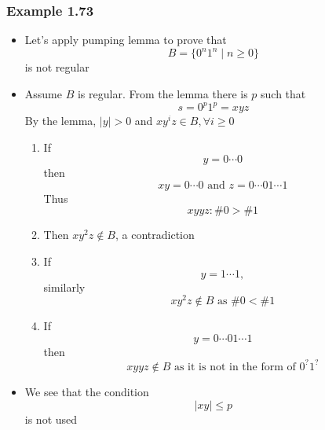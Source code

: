 \begin{frame}[allowframebreaks] \frametitle{Example 1.73}
  \begin{itemize}
  \item Let's apply pumping lemma to prove that
    \begin{equation*}
    B=\{0^n 1^n\mid
    n \geq 0\}
  \end{equation*}
    is not regular
  \item Assume $B$ is regular. From the lemma there is
    $p$ such that
  \begin{equation*}
    s = 0^p 1^p = xy z
  \end{equation*}
  By the lemma, $|y| > 0$ and $xy^i z \in B, \forall i \geq 0$
\begin{enumerate}
\item If
  \begin{equation*}
  y=0 \cdots 0
\end{equation*}
then
\begin{equation*}
xy = 0 \cdots 0 \text{ and }
z = 0 \cdots 0 1 \cdots 1
\end{equation*}
Thus
\begin{equation*}
xyyz: \#0 > \#1
\end{equation*}
\item Then $xy^2 z \notin B$, a contradiction
\item If
  \begin{equation*}
y = 1 \cdots 1,
\end{equation*}
similarly
\begin{equation*}
  xy^2z \notin B \text{ as } \# 0 < \# 1
\end{equation*}

\item If
  \begin{equation*}
y = 0 \cdots 0 1 \cdots 1
\end{equation*}
then
\begin{equation*}
xyyz \notin B \text{ as it is not in the form of } 0^? 1^?
\end{equation*}
\end{enumerate}
\item We see that the condition
  \begin{equation*}
    |xy| \leq p
  \end{equation*}
is not used



\end{itemize}
\end{frame}
